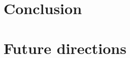 










\section{Conclusion}
\label{sec:conclusion}






\section{Future directions}
\label{sec:future_directions}













